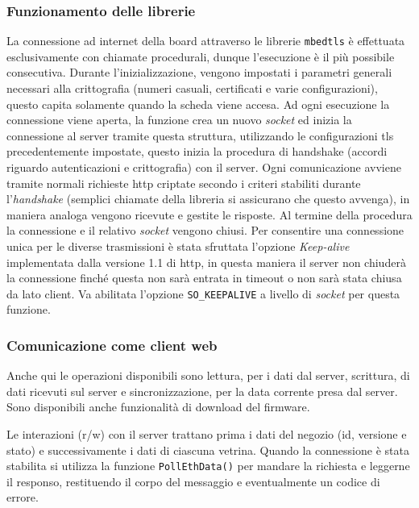 \subsubsection{Funzionamento delle librerie}

La connessione ad internet della board attraverso le librerie \texttt{mbedtls} \`e effettuata esclusivamente con chiamate procedurali, dunque l'esecuzione \`e il pi\`u possibile consecutiva. Durante l'inizializzazione, vengono impostati i parametri generali necessari alla crittografia (numeri casuali, certificati e varie configurazioni), questo capita solamente quando la scheda viene accesa. Ad ogni esecuzione la connessione viene aperta, la funzione crea un nuovo \textit{socket} ed inizia la connessione al server tramite questa struttura, utilizzando le configurazioni tls precedentemente impostate, questo inizia la procedura di handshake (accordi riguardo autenticazioni e crittografia) con il server. Ogni comunicazione avviene tramite normali richieste http criptate secondo i criteri stabiliti durante l'\textit{handshake} (semplici chiamate della libreria si assicurano che questo avvenga), in maniera analoga vengono ricevute e gestite le risposte. Al termine della procedura la connessione e il relativo \textit{socket} vengono chiusi. Per consentire una connessione unica per le diverse trasmissioni \`e stata sfruttata l'opzione \textit{Keep-alive} implementata dalla versione 1.1 di http, in questa maniera il server non chiuder\`a la connessione finch\'e questa non sar\`a entrata in timeout o non sar\`a stata chiusa da lato client. Va abilitata l'opzione \texttt{SO\_KEEPALIVE} a livello di \textit{socket} per questa funzione.

\subsubsection{Comunicazione come client web}


Anche qui le operazioni disponibili sono lettura, per i dati dal server, scrittura, di dati ricevuti sul server e sincronizzazione, per la data corrente presa dal server. Sono disponibili anche funzionalit\`a di download del firmware.

Le interazioni (r/w) con il server trattano prima i dati del negozio (id, versione e stato) e successivamente i dati di ciascuna vetrina. Quando la connessione \`e stata stabilita si utilizza la funzione \texttt{PollEthData()} per mandare la richiesta e leggerne il responso, restituendo il corpo del messaggio e eventualmente un codice di errore.

